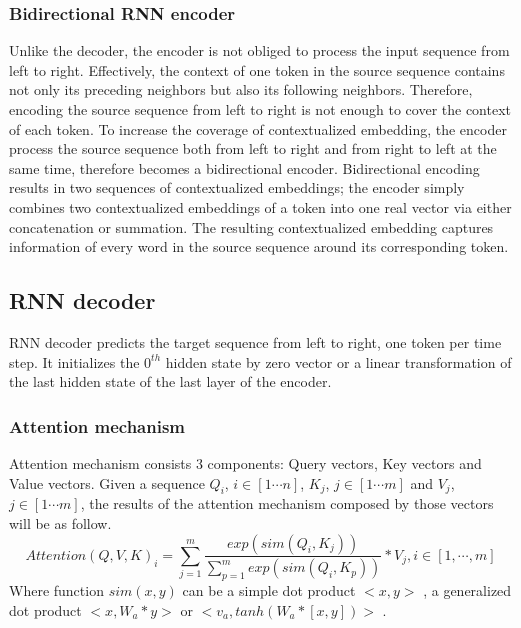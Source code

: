 \subsubsection{Bidirectional RNN encoder}
Unlike the decoder, the encoder is not obliged to process the input sequence from left to right. Effectively, the context of one token in the source sequence contains not only its preceding neighbors but also its following neighbors. Therefore, encoding the source sequence from left to right is not enough to cover the context of each token. To increase the coverage of contextualized embedding, the encoder process the source sequence both from left to right and from right to left at the same time, therefore becomes a bidirectional encoder. Bidirectional encoding results in two sequences of contextualized embeddings; the encoder simply combines two contextualized embeddings of a token into one real vector via either concatenation or summation. The resulting contextualized embedding captures information of every word in the source sequence around its corresponding token. 
\subsection{RNN decoder}
RNN decoder predicts the target sequence from left to right, one token per time step. It initializes the $0^{th}$ hidden state by zero vector or a linear transformation of the last hidden state of the last layer of the encoder. 
\subsubsection{Attention mechanism \label{ssec:attention}}
Attention mechanism consists 3 components: Query vectors, Key vectors and Value vectors. Given a sequence $Q_i$, $i \in [1 \cdots n]$, $K_j$, $j \in [1 \cdots m]$ and $V_j$, $j \in [1 \cdots m]$, the results
of the attention mechanism composed by those vectors will be as follow.
\begin{equation}
Attention(Q,V,K)_i = \displaystyle{\mathop{\sum}_{j=1}^{m}} \frac{exp(sim(Q_i,K_j))}{\displaystyle{\mathop{\sum}_{p=1}^{m}}exp(sim(Q_i,K_p))}*V_j, i \in [1, \cdots, m]
\end{equation}
Where function $sim(x,y)$ can be a simple dot product $<x,y>$ \citep{Vaswani17attention}, a generalized dot product $<x,W_a*y>$ or $<v_a,tanh(W_a*[x,y])>$ \citep{Luong15stanford, Bahdanau15learning}.

